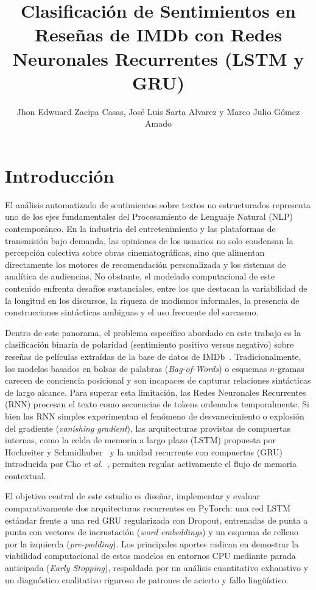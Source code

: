 \documentclass[letterpaper, 10 pt, conference]{ieeeconf}
\title{\LARGE \bf
Clasificación de Sentimientos en Reseñas de IMDb con Redes Neuronales Recurrentes (LSTM y GRU)
}
\author{Jhon Edwuard Zacipa Casas, José Luis Sarta Alvarez y Marco Julio Gómez Amado}
\begin{document}
\maketitle
\thispagestyle{empty}
\pagestyle{empty}

\section{Introducción}

El análisis automatizado de sentimientos sobre textos no estructurados representa uno de los ejes fundamentales del Procesamiento de Lenguaje Natural (NLP) contemporáneo. En la industria del entretenimiento y las plataformas de transmisión bajo demanda, las opiniones de los usuarios no solo condensan la percepción colectiva sobre obras cinematográficas, sino que alimentan directamente los motores de recomendación personalizada y los sistemas de analítica de audiencias. No obstante, el modelado computacional de este contenido enfrenta desafíos sustanciales, entre los que destacan la variabilidad de la longitud en los discursos, la riqueza de modismos informales, la presencia de construcciones sintácticas ambiguas y el uso frecuente del sarcasmo.

Dentro de este panorama, el problema específico abordado en este trabajo es la clasificación binaria de polaridad (sentimiento positivo versus negativo) sobre reseñas de películas extraídas de la base de datos de IMDb~\cite{maas2011}. Tradicionalmente, los modelos basados en bolsas de palabras (\textit{Bag-of-Words}) o esquemas $n$-gramas carecen de conciencia posicional y son incapaces de capturar relaciones sintácticas de largo alcance. Para superar esta limitación, las Redes Neuronales Recurrentes (RNN) procesan el texto como secuencias de tokens ordenados temporalmente. Si bien las RNN simples experimentan el fenómeno de desvanecimiento o explosión del gradiente (\textit{vanishing gradient}), las arquitecturas provistas de compuertas internas, como la celda de memoria a largo plazo (LSTM) propuesta por Hochreiter y Schmidhuber~\cite{hochreiter1997} y la unidad recurrente con compuertas (GRU) introducida por Cho \textit{et al.}~\cite{cho2014}, permiten regular activamente el flujo de memoria contextual.

El objetivo central de este estudio es diseñar, implementar y evaluar comparativamente dos arquitecturas recurrentes en PyTorch: una red LSTM estándar frente a una red GRU regularizada con Dropout, entrenadas de punta a punta con vectores de incrustación (\textit{word embeddings}) y un esquema de relleno por la izquierda (\textit{pre-padding}). Los principales aportes radican en demostrar la viabilidad computacional de estos modelos en entornos CPU mediante parada anticipada (\textit{Early Stopping}), respaldada por un análisis cuantitativo exhaustivo y un diagnóstico cualitativo riguroso de patrones de acierto y fallo lingüístico.
\end{document}
